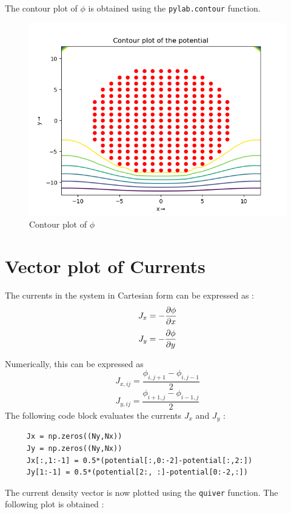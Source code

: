 \documentclass[11pt, a4paper]{article}
\begin{document}
The contour plot of $\phi$ is obtained using the \texttt{pylab.contour} function. 
   \begin{figure}[!h]
 \centering
 \includegraphics[scale=0.5]{contour.png}
 \caption{Contour plot of $\phi$}
 \end{figure}
 \newpage
 
 \section*{Vector plot of Currents}
 
 The currents in the system in Cartesian form can be expressed as :
 \begin{equation*}
 J_{x} = - \pdv{\phi}{x}  
 \end{equation*}
\begin{equation*}
  J_{y} = - \pdv{\phi}{y} 
 \end{equation*}
 
 Numerically, this can be expressed as 
 \begin{equation*}
   J_{x,ij} = \frac{\phi_{i,j+1}-\phi_{i,j-1}}{2}
 \end{equation*} \begin{equation*}
   J_{y,ij} = \frac{\phi_{i+1,j}-\phi_{i-1,j}}{2}
 \end{equation*}The following code block evaluates the currents $J_x$ and $J_y$ :
 \begin{verbatim}
     Jx = np.zeros((Ny,Nx))
     Jy = np.zeros((Ny,Nx))
     Jx[:,1:-1] = 0.5*(potential[:,0:-2]-potential[:,2:])
     Jy[1:-1] = 0.5*(potential[2:, :]-potential[0:-2,:])
 \end{verbatim}
 The current density vector is now plotted using the \texttt{quiver}  function. The following plot is obtained :
 
\end{document}
